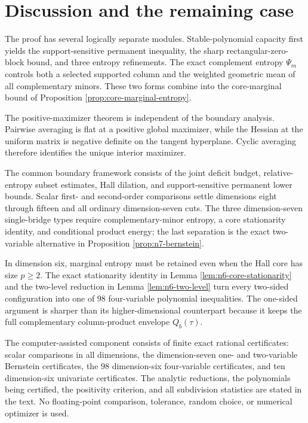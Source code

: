 \documentclass[11pt]{article}
\theoremstyle{definition}
\newcommand{\1}{\mathbf{1}}
\begin{document}
\section{Discussion and the remaining case}\label{sec:discussion}

The proof has several logically separate modules.  Stable-polynomial
capacity first yields the support-sensitive permanent inequality, the sharp
rectangular-zero-block bound, and three entropy refinements.  The exact
complement entropy $\Psi_m$ controls both a selected supported column and the
weighted geometric mean of all complementary minors.  These two forms
combine into the core-marginal bound of Proposition
\ref{prop:core-marginal-entropy}.

The positive-maximizer theorem is independent of the boundary analysis.
Pairwise averaging is flat at a positive global maximizer, while the Hessian
at the uniform matrix is negative definite on the tangent hyperplane.
Cyclic averaging therefore identifies the unique interior maximizer.

The common boundary framework consists of the joint deficit budget,
relative-entropy subset estimates, Hall dilation, and support-sensitive
permanent lower bounds.  Scalar first- and second-order comparisons settle
dimensions eight through fifteen and all ordinary dimension-seven cuts.  The
three dimension-seven single-bridge types require complementary-minor
entropy, a core stationarity identity, and conditional product energy; the
last separation is the exact two-variable alternative in Proposition
\ref{prop:n7-bernstein}.

In dimension six, marginal entropy must be retained even when the Hall core
has size $p\ge2$.  The exact stationarity identity in Lemma
\ref{lem:n6-core-stationarity} and the two-level reduction in Lemma
\ref{lem:n6-two-level} turn every two-sided configuration into one of $98$
four-variable polynomial inequalities.  The one-sided argument is sharper
than its higher-dimensional counterpart because it keeps the full
complementary column-product envelope $Q_b(\tau)$.

The computer-assisted component consists of finite exact rational
certificates: scalar comparisons in all dimensions, the dimension-seven
one- and two-variable Bernstein certificates, the $98$ dimension-six
four-variable certificates, and ten dimension-six univariate certificates.
The analytic reductions, the polynomials being certified, the positivity
criterion, and all subdivision statistics are stated in the text.  No
floating-point comparison, tolerance, random choice, or numerical optimizer
is used.
\end{document}
